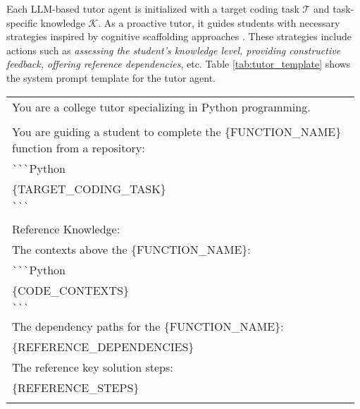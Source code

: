 Each LLM-based tutor agent is initialized with a target coding task $\mathcal{T}$ and task-specific knowledge $\mathcal{K}$. As a proactive tutor, it guides students with necessary strategies inspired by cognitive scaffolding approaches \cite{liu2024scaffolding}. These strategies include actions such as \textit{assessing the student's knowledge level, providing constructive feedback, offering reference dependencies}, etc. Table \ref{tab:tutor_template} shows the system prompt template for the tutor agent.

\begin{table}[th]
\renewcommand{\arraystretch}{0.95}
\begin{tabular}{p{0.98\linewidth}}
\toprule
\ttfamily \footnotesize You are a college tutor specializing in Python programming. \\
\ttfamily \footnotesize \\
\ttfamily \footnotesize You are guiding a student to complete the \{FUNCTION\_NAME\} function from a repository: \\
\ttfamily \footnotesize \verb|```|Python \\
\ttfamily \footnotesize \{TARGET\_CODING\_TASK\} \\
\ttfamily \footnotesize \verb|```| \\
\ttfamily \footnotesize \\
\ttfamily \footnotesize  Reference Knowledge: \\
\ttfamily \footnotesize The contexts above the \{FUNCTION\_NAME\}: \\
\ttfamily \footnotesize \verb|```|Python \\
\ttfamily \footnotesize \{CODE\_CONTEXTS\} \\
\ttfamily \footnotesize \verb|```| \\
\ttfamily \footnotesize The dependency paths for the \{FUNCTION\_NAME\}: \\
\ttfamily \footnotesize \{REFERENCE\_DEPENDENCIES\} \\
\ttfamily \footnotesize The reference key solution steps: \\
\ttfamily \footnotesize \{REFERENCE\_STEPS\} \\
\ttfamily \footnotesize \\


\end{tabular}
\end{table}
